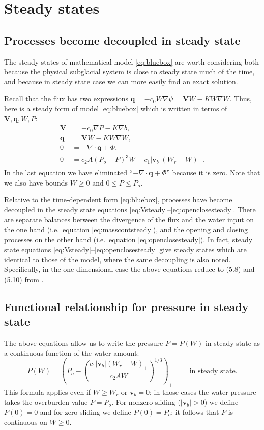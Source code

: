 \documentclass[11pt,final]{amsart}%
\newcommand\bv{\mathbf{v}}
\newcommand\bV{\mathbf{V}}
\newcommand\bq{\mathbf{q}}
\newcommand{\Div}{\nabla\cdot}
\newcommand{\grad}{\nabla}
\begin{document}
\section{Steady states}  \label{sec:steadyverif}

\subsection*{Processes become decoupled in steady state}  The steady states of mathematical model \eqref{eq:bluebox} are worth considering both because the physical subglacial system is close to steady state much of the time, and because in steady state case we can more easily find an exact solution.

Recall that the flux has two expressions $\bq = - c_0 W \grad \psi = \bV W - K W \grad W$.    Thus, here is a steady form of model \eqref{eq:bluebox} which is written in terms of $\bV,\bq,W,P$:
\begin{align}
\bV &= - c_0 \grad P - K \grad b, \label{eq:Vsteady} \\
\bq &= \bV W - K W \grad W, \label{eq:qsteady} \\
0 &= - \Div \bq + \Phi, \label{eq:masscontsteady} \\
0 &= c_2 A (P_o - P)^3 W - c_1 |\bv_b| (W_r - W)_+. \label{eq:openclosesteady}
\end{align}
In the last equation we have eliminated ``$- \Div \bq + \Phi$'' because it is zero.  Note that we also have bounds $W\ge 0$ and $0 \le P \le P_o$.

Relative to the time-dependent form \eqref{eq:bluebox}, processes have become decoupled in the steady state equations \eqref{eq:Vsteady}--\eqref{eq:openclosesteady}.  There are separate balances between the divergence of the flux and the water input on the one hand (i.e.~equation \eqref{eq:masscontsteady}), and the opening and closing processes on the other hand (i.e.~equation \eqref{eq:openclosesteady}).  In fact, steady state equations \eqref{eq:Vsteady}--\eqref{eq:openclosesteady} give steady states which are identical to those of the \cite{Schoofetal2012} model, where the same decoupling is also noted.  Specifically, in the one-dimensional case the above equations reduce to (5.8) and (5.10) from \cite{Schoofetal2012}.

\subsection*{Functional relationship for pressure in steady state}  The above equations allow us to write the pressure $P=P(W)$ in steady state as a continuous function of the water amount:
\begin{equation}
P(W) = \left(P_o - \left(\frac{c_1 |\bv_b| (W_r - W)_+}{c_2 A W}\right)^{1/3}\right)_+ \qquad \text{ in steady state}.  \label{eq:PofWsteady}
\end{equation}
This formula applies even if $W\ge W_r$ or $\bv_b=0$; in those cases the water pressure takes the overburden value $P = P_o$.  For nonzero sliding ($|\bv_b|>0$) we define $P(0)=0$ and for zero sliding we define $P(0)=P_o$; it follows that $P$ is continuous on $W\ge 0$.
\end{document}
